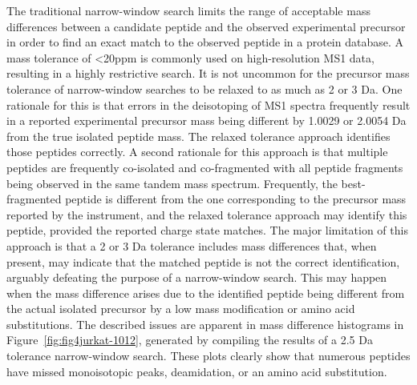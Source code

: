 \documentclass[journal=jprobs,manuscript=article]{achemso}
\begin{document}
The traditional narrow-window search limits the range of acceptable mass differences between a candidate peptide and the observed experimental precursor in order to find an exact match to the observed peptide in a protein database.
A mass tolerance of <20ppm is commonly used on high-resolution MS1 data, resulting in a highly restrictive search.
It is not uncommon for the precursor mass tolerance of narrow-window searches to be relaxed to as much as 2 or 3 Da.
One rationale for this is that errors in the deisotoping of MS1 spectra frequently result in a reported experimental precursor mass being different by 1.0029 or 2.0054 Da from the true isolated peptide mass.
The relaxed tolerance approach identifies those peptides correctly.
A second rationale for this approach is that multiple peptides are frequently co-isolated and co-fragmented with all peptide fragments being observed in the same tandem mass spectrum.
Frequently, the best-fragmented peptide is different from the one corresponding to the precursor mass reported by the instrument, and the relaxed tolerance approach may identify this peptide, provided the reported charge state matches.
The major limitation of this approach is that a 2 or 3 Da tolerance includes mass differences that, when present, may indicate that the matched peptide is not the correct identification, arguably defeating the purpose of a narrow-window search.
This may happen when the mass difference arises due to the identified peptide being different from the actual isolated precursor by a low mass modification or amino acid substitutions.
The described issues are apparent in mass difference histograms in Figure~\ref{fig:fig4jurkat-1012}, generated by compiling the results of a 2.5 Da tolerance narrow-window search.
These plots clearly show that numerous peptides have missed monoisotopic peaks, deamidation, or an amino acid substitution.
\end{document}
